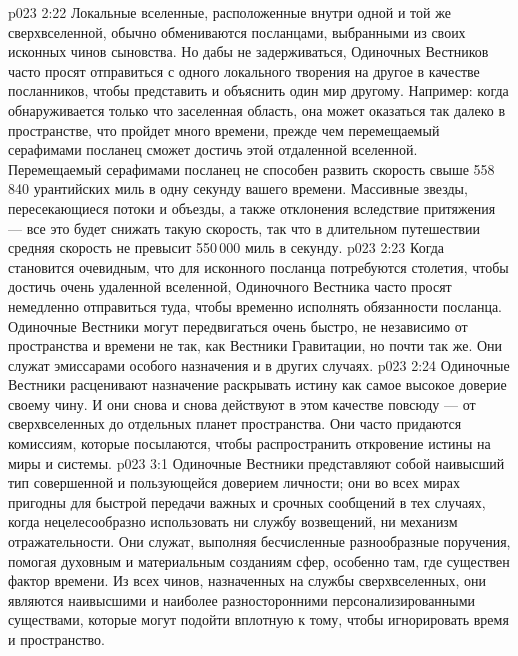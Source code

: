 \vs p023 2:22 \bibnobreakspace {} Локальные вселенные, расположенные внутри одной и той же сверхвселенной, обычно обмениваются посланцами, выбранными из своих исконных чинов сыновства. Но дабы не задерживаться, Одиночных Вестников часто просят отправиться с одного локального творения на другое в качестве посланников, чтобы представить и объяснить один мир другому. Например: когда обнаруживается только что заселенная область, она может оказаться так далеко в пространстве, что пройдет много времени, прежде чем перемещаемый серафимами посланец сможет достичь этой отдаленной вселенной. Перемещаемый серафимами посланец не способен развить скорость свыше 558\,840 урантийских миль в одну секунду вашего времени. Массивные звезды, пересекающиеся потоки и объезды, а также отклонения вследствие притяжения --- все это будет снижать такую скорость, так что в длительном путешествии средняя скорость не превысит 550\,000 миль в секунду.
\vs p023 2:23 Когда становится очевидным, что для исконного посланца потребуются столетия, чтобы достичь очень удаленной вселенной, Одиночного Вестника часто просят немедленно отправиться туда, чтобы временно исполнять обязанности посланца. Одиночные Вестники могут передвигаться очень быстро, не независимо от пространства и времени не так, как Вестники Гравитации, но почти так же. Они служат эмиссарами особого назначения и в других случаях.
\vs p023 2:24 \bibnobreakspace {} Одиночные Вестники расценивают назначение раскрывать истину как самое высокое доверие своему чину. И они снова и снова действуют в этом качестве повсюду --- от сверхвселенных до отдельных планет пространства. Они часто придаются комиссиям, которые посылаются, чтобы распространить откровение истины на миры и системы.
\vs p023 3:1 Одиночные Вестники представляют собой наивысший тип совершенной и пользующейся доверием личности; они во всех мирах пригодны для быстрой передачи важных и срочных сообщений в тех случаях, когда нецелесообразно использовать ни службу возвещений, ни механизм отражательности. Они служат, выполняя бесчисленные разнообразные поручения, помогая духовным и материальным созданиям сфер, особенно там, где существен фактор времени. Из всех чинов, назначенных на службы сверхвселенных, они являются наивысшими и наиболее разносторонними персонализированными существами, которые могут подойти вплотную к тому, чтобы игнорировать время и пространство.
